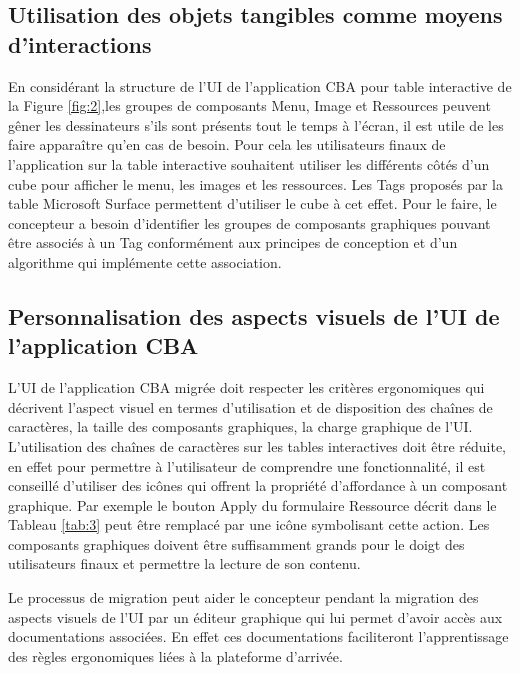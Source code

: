 {\raggedright
\subsection{Utilisation des objets tangibles comme moyens d'interactions}
}
En considérant la structure de l'UI de l'application CBA pour table interactive de
la Figure \ref{fig:2},les groupes de composants Menu, Image et Ressources peuvent gêner les dessinateurs
s'ils sont présents tout le temps à l'écran, il est utile de les faire apparaître qu'en
cas de besoin. Pour cela les utilisateurs finaux de l'application sur la table interactive
souhaitent utiliser les différents côtés d'un cube pour afficher le menu, les images et
les ressources. Les Tags proposés par la table Microsoft Surface permettent d'utiliser le
cube à cet effet.
Pour le faire, le concepteur a besoin d'identifier les groupes de composants graphiques
pouvant être associés à un Tag conformément aux principes de conception et
d'un algorithme qui implémente cette association.

{\raggedright
\subsection{Personnalisation des aspects visuels de l'UI de l'application CBA}
}

L'UI de l'application CBA migrée doit respecter les critères ergonomiques qui décrivent
l'aspect visuel en termes d'utilisation et de disposition des chaînes de caractères,
la taille des composants graphiques, la charge graphique de l'UI.
L'utilisation des chaînes de caractères sur les tables interactives doit être réduite,
en effet pour permettre à l'utilisateur de comprendre une fonctionnalité, il est
conseillé d'utiliser des icônes qui offrent la propriété d'affordance à un composant
graphique. Par exemple le bouton Apply du formulaire Ressource décrit dans le Tableau \ref{tab:3} peut être remplacé par une icône symbolisant cette action. Les composants graphiques doivent être suffisamment grands pour le doigt des utilisateurs finaux et permettre la lecture de son contenu. 

Le processus de migration peut aider le concepteur pendant la migration des aspects visuels de l'UI par un éditeur graphique qui lui permet d'avoir accès aux documentations associées. En effet ces documentations faciliteront l'apprentissage des règles ergonomiques liées à la plateforme d'arrivée.

